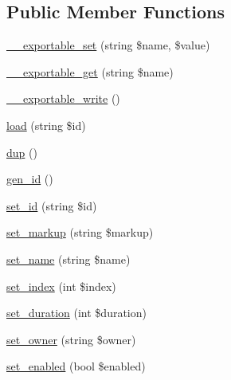 \subsection*{Public Member Functions}
\begin{DoxyCompactItemize}
\item 
\hyperlink{classlibresignage_1_1common_1_1php_1_1slide_1_1Slide_a38aeea7172aec28507ab7aa359c9e314}{\+\_\+\+\_\+exportable\+\_\+set} (string \$name, \$value)
\item 
\hyperlink{classlibresignage_1_1common_1_1php_1_1slide_1_1Slide_a8e259a425560d1c8f537ab9327dee137}{\+\_\+\+\_\+exportable\+\_\+get} (string \$name)
\item 
\hyperlink{classlibresignage_1_1common_1_1php_1_1slide_1_1Slide_a86940669cd20640a43f98147381c52af}{\+\_\+\+\_\+exportable\+\_\+write} ()
\item 
\hyperlink{classlibresignage_1_1common_1_1php_1_1slide_1_1Slide_a7f4a62d13085b3b8e63ca303a77d9a66}{load} (string \$id)
\item 
\hyperlink{classlibresignage_1_1common_1_1php_1_1slide_1_1Slide_a793ec38db84338d4014696b046b4dc11}{dup} ()
\item 
\hyperlink{classlibresignage_1_1common_1_1php_1_1slide_1_1Slide_ab6e0fba0384a41c75f45dacb6b0e2140}{gen\+\_\+id} ()
\item 
\hyperlink{classlibresignage_1_1common_1_1php_1_1slide_1_1Slide_a43eebecde5d49b67e5adc11e71ae01ff}{set\+\_\+id} (string \$id)
\item 
\hyperlink{classlibresignage_1_1common_1_1php_1_1slide_1_1Slide_a716abb23dbf92eb6a0b4a5c6e8a0ff94}{set\+\_\+markup} (string \$markup)
\item 
\hyperlink{classlibresignage_1_1common_1_1php_1_1slide_1_1Slide_a331db9d6bda9ffd93facd1bce07e1acc}{set\+\_\+name} (string \$name)
\item 
\hyperlink{classlibresignage_1_1common_1_1php_1_1slide_1_1Slide_af2d0394d707a7afaac709c7bf457f324}{set\+\_\+index} (int \$index)
\item 
\hyperlink{classlibresignage_1_1common_1_1php_1_1slide_1_1Slide_ad3ac64a4c8b60be6a2e7db43c5939f6f}{set\+\_\+duration} (int \$duration)
\item 
\hyperlink{classlibresignage_1_1common_1_1php_1_1slide_1_1Slide_a04d9f34445019f283a2cf78cbdd4ff6f}{set\+\_\+owner} (string \$owner)
\item 
\hyperlink{classlibresignage_1_1common_1_1php_1_1slide_1_1Slide_a6f97a01838aa170b2296fe0c4fe7b49e}{set\+\_\+enabled} (bool \$enabled)
\item 

\end{DoxyCompactItemize}
